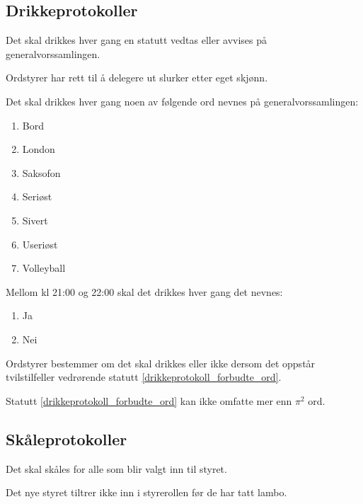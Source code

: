     \subsection{Drikkeprotokoller}
        \begin{statute}
            Det skal drikkes hver gang en statutt vedtas eller avvises på generalvorssamlingen.
        \end{statute}
        \begin{statute}
            Ordstyrer har rett til å delegere ut slurker etter eget skjønn.
        \end{statute}
        \begin{statute}[\label{drikkeprotokoll_forbudte_ord}]
            Det skal drikkes hver gang noen av følgende ord nevnes på generalvorssamlingen: 
            \begin{enumerate}
                \item Bord
                \item London
                \item Saksofon
                \item Seriøst
                \item Sivert
                \item Useriøst
                \item Volleyball
            \end{enumerate}
            Mellom kl 21:00 og 22:00 skal det drikkes hver gang det nevnes: 
            \begin{enumerate}[resume]
                \item Ja
                \item Nei
            \end{enumerate}
        \end{statute}
        \begin{statute}
            Ordstyrer bestemmer om det skal drikkes eller ikke dersom det oppstår tvilstilfeller vedrørende statutt \ref{drikkeprotokoll_forbudte_ord}.
        \end{statute}
        \begin{statute}
            Statutt \ref{drikkeprotokoll_forbudte_ord} kan ikke omfatte mer enn $\pi^2$ ord.
        \end{statute}
        
    \subsection{Skåleprotokoller}
        \begin{statute}
            Det skal skåles for alle som blir valgt inn til styret.
        \end{statute}
        \begin{statute}
            Det nye styret tiltrer ikke inn i styrerollen før de har tatt lambo.
        \end{statute}            
